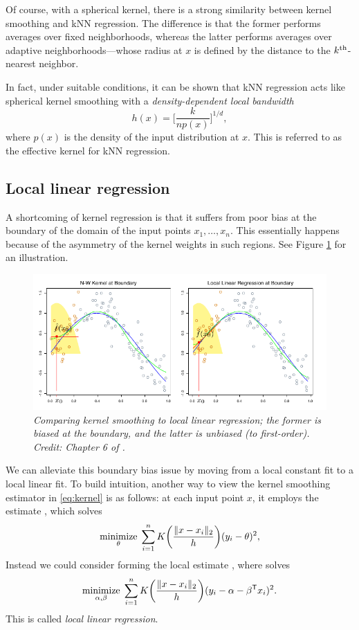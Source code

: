 \documentclass{article}
\begin{document}
Of course, with a spherical kernel, there is a strong similarity between kernel
smoothing and kNN regression. The difference is that the former performs
averages over fixed neighborhoods, whereas the latter performs averages over
adaptive neighborhoods---whose radius at $x$ is defined by the distance to the
$k^{\text{th}}$-nearest neighbor.

In fact, under suitable conditions, it can be shown that kNN regression acts
like spherical kernel smoothing with a \emph{density-dependent local bandwidth}       
\[
h(x) = \bigg[ \frac{k}{n p(x)} \bigg]^{1/d},
\]
where $p(x)$ is the density of the input distribution at $x$. This is referred
to as the effective kernel for kNN regression. 

\subsection{Local linear regression}

A shortcoming of kernel regression is that it suffers from poor bias at the
boundary of the domain of the input points $x_1,\dots,x_n$. This essentially
happens because of the asymmetry of the kernel weights in such regions. See
Figure \ref{fig:bias} for an illustration. 

\begin{figure}[tb]
\centering
\includegraphics[width=\textwidth]{bias.pdf}
\caption{\it Comparing kernel smoothing to local linear regression; the former
  is biased at the boundary, and the latter is unbiased (to
  first-order). Credit: Chapter 6 of \citet{hastie2009elements}.}  
\label{fig:bias}
\end{figure}

We can alleviate this boundary bias issue by moving from a local constant fit to
a local linear fit. To build intuition, another way to view the kernel smoothing
estimator in \eqref{eq:kernel} is as follows: at each input point $x$, it
employs the estimate , which solves 
\[
\mathop{\mathrm{minimize}}_\theta \; \sum_{i=1}^n K\bigg( \frac{\|x-x_i\|_2}{h} \bigg)
(y_i - \theta)^2, 
\]
Instead we could consider forming the local estimate , where  solves
\begin{equation}
\label{eq:llr}
\mathop{\mathrm{minimize}}_{\alpha, \beta} \; \sum_{i=1}^n K\bigg( \frac{\|x-x_i\|_2}{h} \bigg) 
(y_i - \alpha - \beta^{\mathsf{T}} x_i)^2. 
\end{equation}
This is called \emph{local linear regression}.
\end{document}
